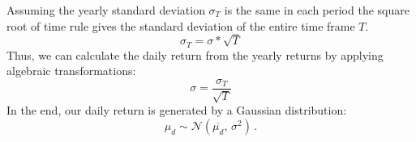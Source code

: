 Assuming the yearly standard deviation $\sigma_T$ is the same in each period  the square root of time rule gives the standard deviation of the entire time frame $T$.
\begin{equation}
    \sigma_T = \sigma*\sqrt{T}
\end{equation}
Thus, we can calculate the daily return from the yearly returns by applying algebraic transformations:
\begin{equation}
    \sigma = \frac{\sigma_T}{\sqrt{T}}
\end{equation}
In the end, our daily return is generated by a Gaussian distribution:
\begin{equation}
	\mu_d \sim \mathcal{N}(\overline{\mu_d},\,\sigma^{2})\,.
\end{equation}